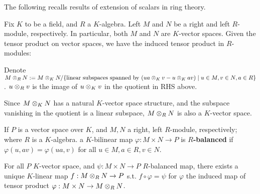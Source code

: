 \documentclass{article}
\begin{document}
\textstart
The following recalls results of extension of scalars in ring theory.

Fix $K$ to be a field, and $R$ a $K$-algebra. Left $M$ and $N$ be a right and left $R$-module, respectively. In particular, both $M$ and $N$ are $K$-vector spaces. Given the tensor product on vector spaces, we have the induced tensor product in $R$-modules:

\begin{notation}
    Denote $M \otimes_R N := M \otimes_K N / \{\text{linear subspaces spanned by $(ua \otimes_K v - u \otimes_K av) \mid u \in M, v \in N, a \in R$}\}$. $u \otimes_R v$ is the image of $u \otimes_K v$ in the quotient in RHS above.
\end{notation}

\begin{remark}
    Since $M \otimes_K N$ has a natural $K$-vector space structure, and the subspace vanishing in the quotient is a linear subspace, $M \otimes_R N$ is also a $K$-vector space.
\end{remark}

\begin{definition}[Balanced]
    If $P$ is a vector space over $K$, and $M, N$ a right, left $R$-module, respectively; where $R$ is a $K$-algebra. a $K$-bilinear map $\varphi: M \times N \to P$ is \textbf{$R$-balanced} if $\varphi(u, av) = \varphi(ua, v)$ for all $u \in M, a \in R, v \in N$.
\end{definition}

\begin{proposition}
    For all $P$ $K$-vector space, and $\psi: M \times N \to P$ $R$-balanced map, there exists a unique $K$-linear map $f: M \otimes_R N \to P$ s.t. $f \circ \varphi = \psi$ for $\varphi$ the induced map of tensor product $\varphi: M \times N \to M \otimes_R N$.
\end{proposition}
\end{document}
